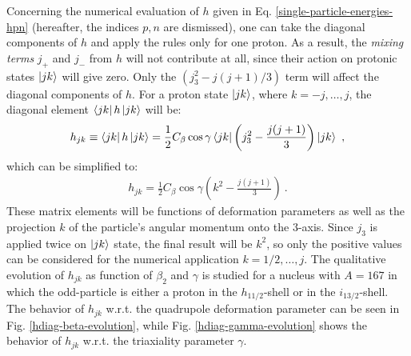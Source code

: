 Concerning the numerical evaluation of $h$ given in Eq. \ref{single-particle-energies-hpn} (hereafter, the indices $p,n$ are dismissed), one can take the diagonal components of $h$ and apply the rules only for one proton. As a result, the \emph{mixing terms} $j_+$ and $j_-$ from $h$ will not contribute at all, since their action on protonic states $\ket{jk}$ will give zero. Only the $(j_3^2-j(j+1)/3)$ term will affect the diagonal components of $h$. For a proton state $\ket{jk}$, where $k=-j,\dots,j$, the diagonal element $\bra{jk}h\ket{jk}$ will be:
\begin{align}
    h_{jk}\equiv\bra{jk}h\ket{jk}=\frac{1}{2}C_\beta\cos\gamma\bra{jk}\left(j_3^2-\frac{j(j+1)}{3}\right)\ket{jk}\ ,
    \label{hdiag-equation-general}
\end{align}
which can be simplified to:
\begin{align}
    h_{jk}=\frac{1}{2}C_\beta\cos\gamma\left(k^2-\frac{j(j+1)}{3}\right)\ .
    \label{hdiag-equation}
\end{align}
These matrix elements will be functions of deformation parameters as well as the projection $k$ of the particle's angular momentum onto the $3$-axis. Since $j_3$ is applied twice on $\ket{jk}$ state, the final result will be $k^2$, so only the positive values can be considered for the numerical application $k=1/2,\dots,j$. The qualitative evolution of $h_{jk}$ as function of $\beta_2$ and $\gamma$ is studied for a nucleus with $A=167$ in which the odd-particle is either a proton in the $h_{11/2}$-shell or in the $i_{13/2}$-shell. The behavior of $h_{jk}$ w.r.t. the quadrupole deformation parameter can be seen in Fig. \ref{hdiag-beta-evolution}, while Fig. \ref{hdiag-gamma-evolution} shows the behavior of $h_{jk}$ w.r.t. the triaxiality parameter $\gamma$.
